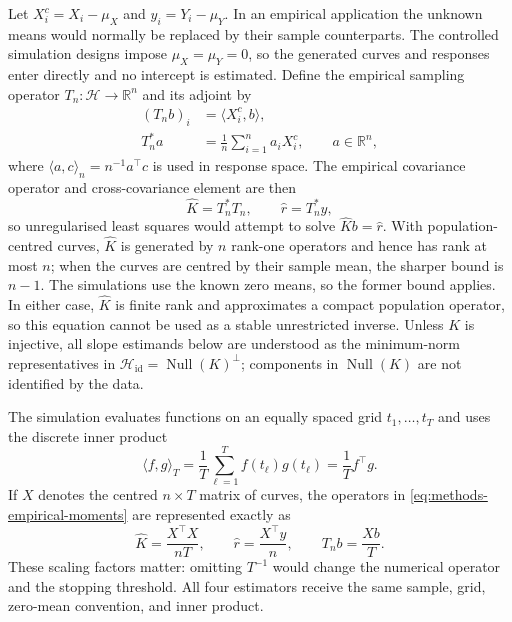 Let $X_i^c=X_i-\mu_X$ and $y_i=Y_i-\mu_Y$.  In an empirical application the
unknown means would normally be replaced by their sample counterparts.  The
controlled simulation designs impose $\mu_X=\mu_Y=0$, so the generated
curves and responses enter directly and no intercept is estimated.
Define the empirical sampling operator
$T_n:\mathcal H\rightarrow\mathbb R^n$ and its adjoint by
\begin{align}
    (T_nb)_i
    &=\langle X_i^c,b\rangle,
    \label{eq:methods-sampling-operator}\\
    T_n^*a
    &=\frac1n\sum_{i=1}^{n}a_iX_i^c,
    \qquad a\in\mathbb R^n,
    \label{eq:methods-adjoint-operator}
\end{align}
where $\langle a,c\rangle_n=n^{-1}a^\top c$ is used in response space.  The
empirical covariance operator and cross-covariance element are then
\begin{equation}
    \widehat K=T_n^*T_n,
    \qquad
    \widehat r=T_n^*y,
    \label{eq:methods-empirical-moments}
\end{equation}
so unregularised least squares would attempt to solve
$\widehat Kb=\widehat r$.  With population-centred curves, $\widehat K$ is
generated by $n$ rank-one operators and hence has rank at most $n$; when the
curves are centred by their sample mean, the sharper bound is $n-1$.  The
simulations use the known zero means, so the former bound applies.  In either
case, $\widehat K$ is finite rank and approximates a compact population
operator, so this equation cannot be used as a stable unrestricted inverse.
Unless $K$ is injective, all slope estimands below are understood as the
minimum-norm representatives in
$\mathcal H_{\mathrm{id}}=\operatorname{Null}(K)^\perp$; components in
$\operatorname{Null}(K)$ are not identified by the data.

The simulation evaluates functions on an equally spaced grid
$t_1,\ldots,t_T$ and uses the discrete inner product
\begin{equation}
    \langle f,g\rangle_T
    =\frac1T\sum_{\ell=1}^{T}f(t_\ell)g(t_\ell)
    =\frac1T f^\top g.
    \label{eq:methods-discrete-inner-product}
\end{equation}
If $X$ denotes the centred $n\times T$ matrix of curves, the operators in
\eqref{eq:methods-empirical-moments} are represented exactly as
\begin{equation}
    \widehat K=\frac{X^\top X}{nT},
    \qquad
    \widehat r=\frac{X^\top y}{n},
    \qquad
    T_nb=\frac{Xb}{T}.
    \label{eq:methods-grid-moments}
\end{equation}
These scaling factors matter: omitting $T^{-1}$ would change the numerical
operator and the stopping threshold.  All four estimators receive the same
sample, grid, zero-mean convention, and inner product.

